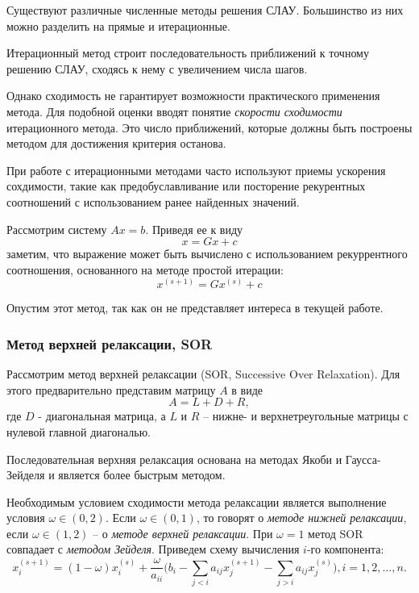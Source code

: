 \documentclass[12pt]{article}
\begin{document}
    
	
	Существуют различные численные методы решения СЛАУ. Большинство из них можно разделить на прямые и итерационные.
	
	 Итерационный метод строит последовательность приближений к точному решению СЛАУ, сходясь к нему с увеличением числа шагов.
	
	Однако сходимость не гарантирует возможности практического применения метода. Для подобной оценки вводят понятие {\it скорости сходимости } итерационного метода. Это число приближений, которые должны быть построены методом для достижения критерия останова. 
	
	При работе с итерационными методами часто используют приемы ускорения сохдимости, такие как предобуславливание или посторение рекурентных соотношений с использованием ранее найденных значений. 

	Рассмотрим систему $Ax=b$. Приведя ее к виду 
	$$x=Gx+c$$ 
	заметим, что выражение может быть вычислено с использованием рекуррентного соотношения, основанного на методе простой итерации:
	$$x^{(s+1)} = G x^{(s)} + c$$
	
	Опустим этот метод, так как он не представляет интереса в текущей работе. 
	
	
	
	\bigskip
	{
		\subsubsection{Метод верхней релаксации, SOR}
	}
	
	Рассмотрим метод верхней релаксации (SOR, Successive Over Relaxation). Для этого предварительно представим матрицу $A$ в виде 
	$$A=L+D+R,$$
	где $D$ - диагональная матрица, а $L$ и $R$ -- нижне- и верхнетреугольные матрицы с нулевой главной диагональю.
	
	Последовательная верхняя релаксация основана на методах Якоби и Гаусса-Зейделя и является более быстрым методом. 
	
	Необходимым условием сходимости метода релаксации является выполнение условия $\omega \in (0,2)$. Если $\omega \in (0,1)$, то говорят о {\it методе нижней релаксации}, если $\omega \in (1,2)$ -- о {\it методе верхней релаксации}. При $\omega = 1$ метод SOR совпадает с {\it методом Зейделя}.
	Приведем схему вычисления $i$-го компонента:
	$$x^{(s+1)}_{i} = (1-\omega)x^{(s)}_i + \frac{\omega}{a_{ii}} \Big( b_i - \sum\limits_{j<i} a_{ij} x^{(s+1)}_j - \sum\limits_{j>i} a_{ij} x^{(s)}_j \Big), i = 1,2, \dots ,n. $$
	
\end{document}
